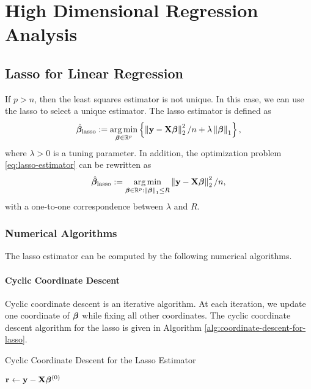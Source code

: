 \chapter{High Dimensional Regression Analysis}

\section{Lasso for Linear Regression}

If $p>n$, then the least squares estimator is not unique. In this case, we can use the lasso to select a unique estimator. The lasso estimator is defined as
\begin{equation}
	\label{eq:lasso-estimator}
	\hat{\boldsymbol{\beta}}_{\text{lasso}}:=\underset{\boldsymbol{\beta}\in{\mathbb R}^{p}}{\arg\min}\left\{\left\|{\bf y}-{\bf X}\boldsymbol{\beta}\right\|_{2}^{2}/n+\lambda\left\|\boldsymbol{\beta}\right\|_{1}\right\},
\end{equation}
where $\lambda>0$ is a tuning parameter. In addition, the optimization problem \eqref{eq:lasso-estimator} can be rewritten as
\begin{equation*}
	\hat{\boldsymbol{\beta}}_{\text{lasso}}:=\underset{\boldsymbol{\beta}\in{\mathbb R}^{p}:\left\|\boldsymbol{\beta}\right\|_{1}\leq R}{\arg\min}\left\|{\bf y}-{\bf X}\boldsymbol{\beta}\right\|_{2}^{2}/n,
\end{equation*}
with a one-to-one correspondence between $\lambda$ and $R$.

\subsection{Numerical Algorithms}

The lasso estimator can be computed by the following numerical algorithms.

\subsubsection{Cyclic Coordinate Descent}

Cyclic coordinate descent is an iterative algorithm. At each iteration, we update one coordinate of $\boldsymbol{\beta}$ while fixing all other coordinates.
The cyclic coordinate descent algorithm for the lasso is given in Algorithm \ref{alg:coordinate-descent-for-lasso}.

\begin{algorithm}[H]
	\caption{Cyclic Coordinate Descent for the Lasso Estimator}
	\label{alg:coordinate-descent-for-lasso}
	${\bf r} \leftarrow {\bf y}-{\bf X}\boldsymbol{\beta}^{(0)}$\;
\end{algorithm}

